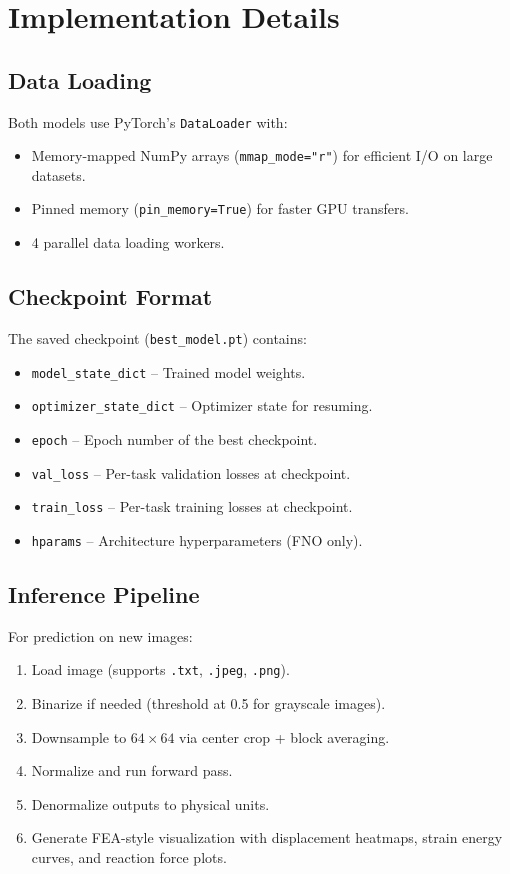 \documentclass[11pt,a4paper]{article}
\begin{document}
\section{Implementation Details}
\label{sec:implementation}

\subsection{Data Loading}

Both models use PyTorch's \texttt{DataLoader} with:
\begin{itemize}[leftmargin=2em]
    \item Memory-mapped NumPy arrays (\texttt{mmap\_mode="r"}) for efficient
          I/O on large datasets.
    \item Pinned memory (\texttt{pin\_memory=True}) for faster GPU transfers.
    \item 4 parallel data loading workers.
\end{itemize}

\subsection{Checkpoint Format}

The saved checkpoint (\texttt{best\_model.pt}) contains:
\begin{itemize}[leftmargin=2em]
    \item \texttt{model\_state\_dict} -- Trained model weights.
    \item \texttt{optimizer\_state\_dict} -- Optimizer state for resuming.
    \item \texttt{epoch} -- Epoch number of the best checkpoint.
    \item \texttt{val\_loss} -- Per-task validation losses at checkpoint.
    \item \texttt{train\_loss} -- Per-task training losses at checkpoint.
    \item \texttt{hparams} -- Architecture hyperparameters (FNO only).
\end{itemize}

\subsection{Inference Pipeline}

For prediction on new images:
\begin{enumerate}[leftmargin=2em]
    \item Load image (supports \texttt{.txt}, \texttt{.jpeg}, \texttt{.png}).
    \item Binarize if needed (threshold at 0.5 for grayscale images).
    \item Downsample to $64 \times 64$ via center crop + block averaging.
    \item Normalize and run forward pass.
    \item Denormalize outputs to physical units.
    \item Generate FEA-style visualization with displacement heatmaps,
          strain energy curves, and reaction force plots.
\end{enumerate}
\end{document}
